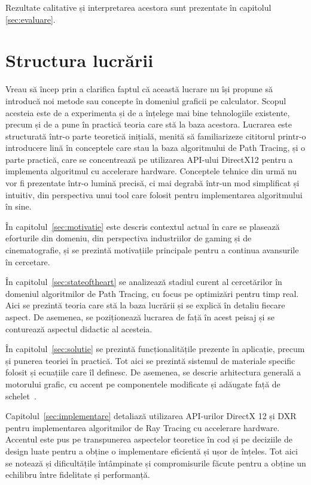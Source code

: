 \documentclass[12pt,a4paper]{report}
\numberwithin{equation}{section} %
\begin{document}
Rezultate calitative și interpretarea acestora sunt prezentate în capitolul \ref{sec:evaluare}.

\section{Structura lucrării}

Vreau să încep prin a clarifica faptul că această lucrare nu își propune să introducă
noi metode sau concepte în domeniul graficii pe calculator. Scopul acesteia
este de a experimenta și de a înțelege mai bine tehnologiile existente, precum
și de a pune în practică teoria care stă la baza acestora. Lucrarea este structurată
într-o parte teoretică inițială, menită să familiarizeze cititorul printr-o introducere lină
în conceptele care stau la baza algoritmului de Path Tracing, și o parte practică,
care se concentrează pe utilizarea API-ului DirectX12 pentru a implementa algoritmul
cu accelerare hardware. Conceptele tehnice din urmă nu vor fi prezentate
într-o lumină precisă, ci mai degrabă într-un mod simplificat și intuitiv, din
perspectiva unui tool care folosit pentru implementarea algoritmului în sine.

În capitolul~\ref{sec:motivatie} este descris contextul actual în care se plasează
eforturile din domeniu, din perspectiva industriilor de gaming și de cinematografie,
și se prezintă motivațiile principale pentru a continua avansurile în cercetare.

În capitolul~\ref{sec:stateoftheart} se analizează stadiul curent al cercetărilor
în domeniul algoritmilor de Path Tracing, cu focus pe optimizări pentru timp real.
Aici se prezintă teoria care stă la baza lucrării și se explică în detaliu fiecare
aspect.
De asemenea, se poziționează lucrarea de față în acest peisaj și se conturează
aspectul didactic al acesteia.

În capitolul~\ref{sec:solutie} se prezintă funcționalitățile prezente în aplicație,
precum și punerea teoriei în practică. Tot aici se prezintă sistemul de materiale
specific folosit și ecuațiile care îl definesc. De asemenea, se descrie arhitectura
generală a motorului grafic, cu accent pe componentele modificate și adăugate
față de schelet~\cite{Schelet}.

Capitolul~\ref{sec:implementare} detaliază utilizarea API-urilor DirectX 12 și DXR
pentru implementarea algoritmilor de Ray Tracing cu accelerare hardware. Accentul
este pus pe transpunerea aspectelor teoretice în cod și pe deciziile de design luate pentru a obține o implementare
eficientă și ușor de înțeles. Tot aici se notează și dificultățile întâmpinate
și compromisurile făcute pentru a obține un echilibru între fidelitate și performanță.
\end{document}
